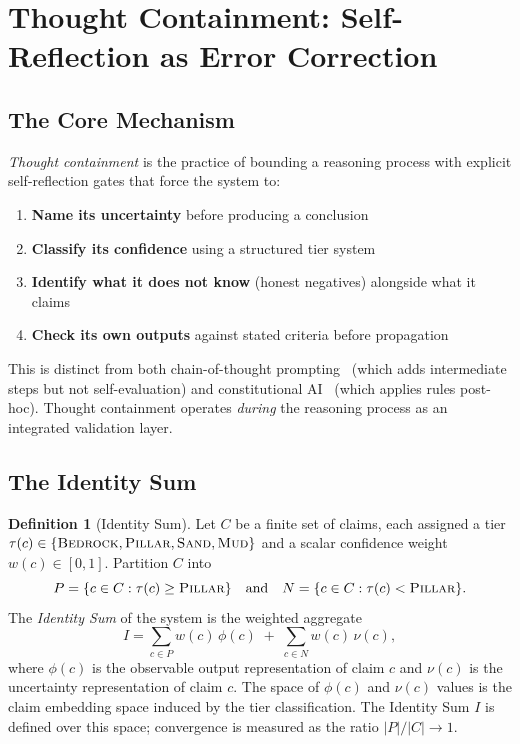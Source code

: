 \documentclass[11pt]{article}
\theoremstyle{definition}
\newtheorem{definition}[theorem]{Definition}
\theoremstyle{remark}
\newcommand{\BEDROCK}{\textsc{Bedrock}}
\newcommand{\PILLAR}{\textsc{Pillar}}
\newcommand{\SAND}{\textsc{Sand}}
\newcommand{\MUD}{\textsc{Mud}}
\begin{document}
\section{Thought Containment: Self-Reflection as Error Correction}
\label{sec:thought-containment}

\subsection{The Core Mechanism}
\label{sec:core-mechanism}

\emph{Thought containment} is the practice of bounding a reasoning process with
explicit self-reflection gates that force the system to:
\begin{enumerate}
  \item \textbf{Name its uncertainty} before producing a conclusion
  \item \textbf{Classify its confidence} using a structured tier system
  \item \textbf{Identify what it does not know} (honest negatives) alongside what
    it claims
  \item \textbf{Check its own outputs} against stated criteria before propagation
\end{enumerate}

This is distinct from both chain-of-thought prompting~\cite{wei2022cot} (which
adds intermediate steps but not self-evaluation) and constitutional
AI~\cite{bai2022constitutional} (which applies rules post-hoc).  Thought
containment operates \emph{during} the reasoning process as an integrated
validation layer.

\subsection{The Identity Sum}
\label{sec:identity-sum-def}

\begin{definition}[Identity Sum]
\label{def:identity-sum}
Let $C$ be a finite set of claims, each assigned a tier
$\tau(c) \in \{\BEDROCK, \PILLAR, \SAND, \MUD\}$ and a scalar confidence weight
$w(c) \in [0,1]$.  Partition $C$ into
\[
  P = \{c \in C : \tau(c) \geq \PILLAR\}
  \quad\text{and}\quad
  N = \{c \in C : \tau(c) < \PILLAR\}.
\]
The \emph{Identity Sum} of the system is the weighted aggregate
\begin{equation}
  I = \sum_{c \in P} w(c)\,\phi(c) \;+\; \sum_{c \in N} w(c)\,\nu(c),
  \label{eq:identity-sum}
\end{equation}
where $\phi(c)$ is the observable output representation of claim $c$ and
$\nu(c)$ is the uncertainty representation of claim $c$.  The space of $\phi(c)$
and $\nu(c)$ values is the claim embedding space induced by the tier
classification.  The Identity Sum $I$ is defined over this space; convergence is
measured as the ratio $|P|/|C| \to 1$.
\end{definition}
\end{document}
